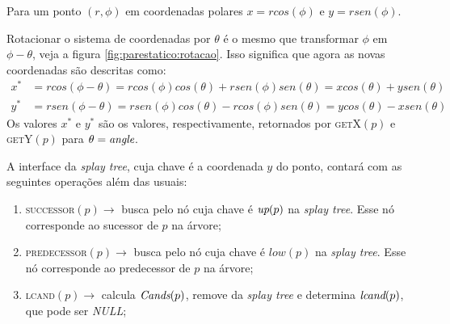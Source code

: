 Para um ponto $(r, \phi)$ em coordenadas polares $x = rcos(\phi)$
e $y = rsen(\phi)$.

Rotacionar o sistema de coordenadas por $\theta$ é o mesmo que
transformar $\phi$ em $\phi - \theta$, veja a figura
\ref{fig:parestatico:rotacao}. Isso significa que agora as novas
coordenadas são descritas como:
\begin{align*}
    x^* & = rcos(\phi - \theta) = rcos(\phi)cos(\theta)
    + rsen(\phi)sen(\theta) = xcos(\theta) + ysen(\theta) \\
    y^* & = rsen(\phi - \theta) = rsen(\phi)cos(\theta)
    - rcos(\phi)sen(\theta) = ycos(\theta) - xsen(\theta)
\end{align*}
Os valores $x^*$ e $y^*$ são os valores, respectivamente,
retornados por \textsc{getX}$(p)$ e \textsc{getY}$(p)$ para
$\theta = \textit{angle}$.



A interface da \textit{splay tree}, cuja chave é a
coordenada $y$ do ponto, contará com as seguintes operações além
das usuais:
\begin{enumerate}
    \item \textsc{successor}$(p) \rightarrow$ busca pelo nó
    cuja chave é $\textit{up}(p)$ na \textit{splay tree}.
    Esse nó corresponde ao sucessor de $p$ na árvore;
    \item \textsc{predecessor}$(p) \rightarrow$ busca pelo nó cuja chave é $low(p)$ na \textit{splay tree}. Esse nó corresponde ao predecessor de $p$ na árvore;
    \item \textsc{lcand}$(p) \rightarrow$ calcula $\textit{Cands}(p)$, remove da
    \textit{splay tree} e determina $\textit{lcand}(p)$, que pode ser \textit{NULL};
\end{enumerate}


